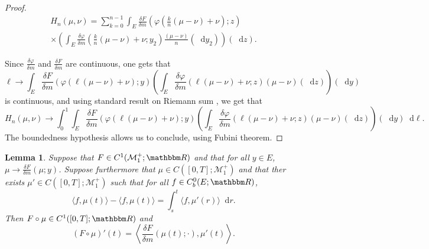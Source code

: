 \documentclass[a4paper,11pt, reqno]{amsart}
\newcommand{\cM}{\mathcal{M}}	\newcommand{\MM}{\mathbbm{M}}
\newcommand{\dd}{\mathop{}\!\mathrm{d}}
\newcommand{\1}{\mathbbm{1}}
\theoremstyle{plain}
\newtheorem{lemma}[theorem]{Lemma}
\theoremstyle{definition}
\begin{document}
\begin{proof}
  \begin{multline*}
    H_n (\mu, \nu) = \sum_{k = 0}^{n - 1} \int_E \frac{\delta F}{\delta m}
    \left( \varphi \left( \frac{k}{n} (\mu - \nu) + \nu \right) ; z \right)\\
    \times \left( \int_E \frac{\delta \varphi}{\delta m} \left( \frac{k}{n}
    (\mu - \nu) + \nu ; y_2 \right) \frac{(\mu - \nu)}{n} (\dd y_2) \right)
    (\dd z) .
  \end{multline*}
  
  Since $\frac{\delta \varphi}{\delta m}$ and $\frac{\delta F}{\delta m}$ are
  continuous, one gets that
  \[ \ell \rightarrow \int_E \frac{\delta F}{\delta m} (\varphi (\ell (\mu -
     \nu) + \nu) ; y) \left( \int_E \frac{\delta \varphi}{\delta m} (\ell (\mu
     - \nu) + \nu ; z) (\mu - \nu) (\dd z) \right) (\dd y) \]
  is continuous, and using standard result on Riemann sum , we get that
  \[ H_n (\mu, \nu) \rightarrow \int_0^1 \int_E \frac{\delta F}{\delta m}
     (\varphi (\ell (\mu - \nu) + \nu) ; y) \left( \int_E \frac{\delta
     \varphi}{\delta m} (\ell (\mu - \nu) + \nu ; z) (\mu - \nu) (\dd z)
     \right) (\dd y) \dd \ell . \]
  The boundedness hypothesis allows us to conclude, using Fubini theorem.
\end{proof}

\begin{lemma}
  \label{lemma:chain-rule-flow}Suppose that $F \in C^1 (\cM^+_1 ;
  \RR)$ and that for all $y \in E$, $\mu \rightarrow \frac{\delta
  F}{\delta m} (\mu ; y)$. Suppose furthermore that $\mu \in C ([0, T] ;
  \cM^+_1)$ and that ther exists $\mu' \in C ([0, T] ;
  \cM^+_1)$ such that for all $f \in C^0_b (E ; \RR)$,
  \[ \langle f, \mu (t) \rangle - \langle f, \mu (t) \rangle = \int_s^t
     \langle f, \mu' (r) \rangle \dd r. \]
  Then $F \circ \mu \in C^1 ([0, T] ; \RR)$ and
  \[ (F \circ \mu)' (t) = \left\langle \frac{\delta F}{\delta m} (\mu (t) ;
     \cdot), \mu' (t) \right\rangle . \]
\end{lemma}
\end{document}
